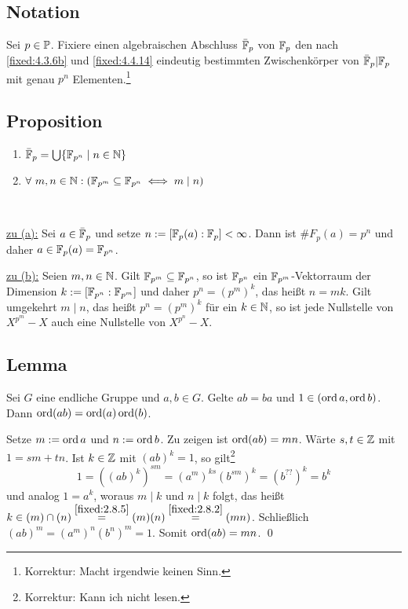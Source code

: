 \subsection{Notation} Sei $p \in \P$. Fixiere einen algebraischen Abschluss $\bar \F_p$ von $\F_p$ den nach \ref{fixed:4.3.6b} und \ref{fixed:4.4.14} eindeutig bestimmten Zwischenkörper von $\bar \F_p|\F_p$ mit genau $p^n$ Elementen.\footnote{Korrektur: Macht irgendwie keinen Sinn.}

\subsection{Proposition}
\begin{enumerate}[label=(\alph*)]
	\item
		$\bar \F_p = \bigcup\{\F_{p^n} \mid n \in \N\}$
		
	\item
		$\forall~m,n \in \N : (\F_{p^m} \subseteq \F_{p^n} \iff m \mid n)$
\end{enumerate}

\proof ~

\underline{zu (a):} Sei $a \in \bar \F_p$ und setze $n := [\F_p(a) : \F_p] < \infty$. Dann ist $\#F_p(a) = p^n$ und daher $a \in \F_p(a) = \F_{p^n}$.

\underline{zu (b):} Seien $m,n \in \N$. Gilt $\F_{p^m} \subseteq \F_{p^n}$, so ist $\F_{p^n}$ ein $\F_{p^m}$-Vektorraum der Dimension $k := [\F_{p^n} : \F_{p^m}]$ und daher $p^n = (p^m)^k$, das heißt $n=mk$. Gilt umgekehrt $m \mid n$, das heißt $p^n = (p^m)^k$ für ein $k \in \N$, so ist jede Nullstelle von $X^{p^m} - X$ auch eine Nullstelle von $X^{p^n} - X$.

\subsection{Lemma} Sei $G$ eine endliche Gruppe und $a,b \in G$. Gelte $ab = ba$ und $1 \in (\ord a, \ord b)$. Dann $\ord (ab) = \ord(a) \ord(b)$.

\proof Setze $m := \ord a$ und $n := \ord b$. Zu zeigen ist $\ord(ab)=mn$. Wärte $s,t \in \Z$ mit $1 = sm+tn$. Ist $k \in \Z$ mit $(ab)^k = 1$, so gilt\footnote{Korrektur: Kann ich nicht lesen.}
$$1 = ((ab)^k)^{sm} = (a^m)^{ks}(b^{sm})^k = (b^{??})^k = b^k$$
und analog $1 = a^k$, woraus $m \mid k$ und $n \mid k$ folgt, das heißt $k \in (m) \cap (n) \overset{\ref{fixed:2.8.5}}{=} (m)(n) \overset{\ref{fixed:2.8.2}}{=} (mn)$. Schließlich $(ab)^m = (a^m)^n(b^n)^m = 1$. Somit $\ord(ab)=mn$. \qed

